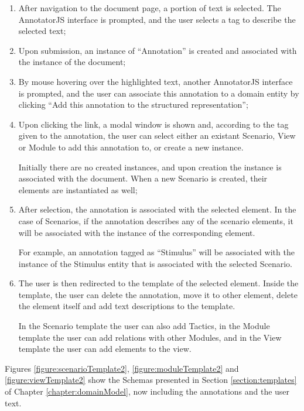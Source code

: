 \documentclass{llncs}
\begin{document}
\begin{enumerate}
\item After navigation to the document page, a portion of text is selected. The AnnotatorJS interface is prompted, and the user selects a tag to describe the selected text;

\item Upon submission, an instance of ``Annotation'' is created and associated with the instance of the document;

\item By mouse hovering over the highlighted text, another AnnotatorJS interface is prompted, and the user can associate this annotation to a domain entity by clicking ``Add this annotation to the structured representation'';

\item Upon clicking the link, a modal window is shown and, according to the tag given to the annotation, the user can select either an existant Scenario, View or Module to add this annotation to, or create a new instance. 

Initially there are no created instances, and upon creation the instance is associated with the document. When a new Scenario is created, their elements are instantiated as well;

\item After selection, the annotation is associated with the selected element. In the case of Scenarios, if the annotation describes any of the scenario elements, it will be associated with the instance of the corresponding element. 

For example, an annotation tagged as ``Stimulus'' will be associated with the instance of the Stimulus entity that is associated with the selected Scenario.

\item The user is then redirected to the template of the selected element. Inside the template, the user can delete the annotation, move it to other element, delete the element itself and add text descriptions to the template. 

In the Scenario template the user can also add Tactics, in the Module template the user can add relations with other Modules, and in the View template the user can add elements to the view.
\end{enumerate}

Figures \ref{figure:scenarioTemplate2}, \ref{figure:moduleTemplate2} and \ref{figure:viewTemplate2} show the Schemas presented in Section \ref{section:templates} of Chapter \ref{chapter:domainModel}, now including the annotations and the user text.
\end{document}
